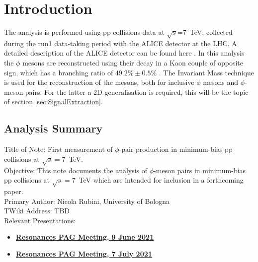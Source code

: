 \section{Introduction}
\label{sec:Introduction}
The analysis is performed using pp collisions data at $\sqrt{s}$=\SI{7}{\tera\electronvolt}, collected during the run1 data-taking period with the ALICE detector at the LHC. A detailed description of the ALICE detector can be found here \cite{Collaboration_2008}. In this analysis the $\phi$ mesons are reconstructed using their decay in a Kaon couple of opposite sign, which has a branching ratio of $49.2\%\pm 0.5\%$ \cite{PDG}. The Invariant Mass technique is used for the reconstruction of the mesons, both for inclusive $\phi$ mesons and $\phi$-meson pairs. For the latter a 2D generalisation is required, this will be the topic of section \ref{sec:SignalExtraction}.\\

\subsection{Analysis Summary}
Title of Note: First measurement of $\phi$-pair production in minimum-bias pp collisions at $\sqrt{s}=$\SI{7}{\tera\electronvolt}.\\
Objective: This note documents the analysis of $\phi$-meson pairs in minimum-bias pp collisions at $\sqrt{s}=$\SI{7}{\tera\electronvolt} which are intended for inclusion in a forthcoming paper.\\
Primary Author: Nicola Rubini, University of Bologna\\
TWiki Address: TBD\\
Relevant Presentations:
\begin{itemize}
\item \href{https://indico.cern.ch/event/1046617/}{\bf{Resonances PAG Meeting, 9 June 2021}}
\item \href{https://indico.cern.ch/event/1052315/}{\bf{Resonances PAG Meeting, 7 July 2021}}
\end{itemize}

